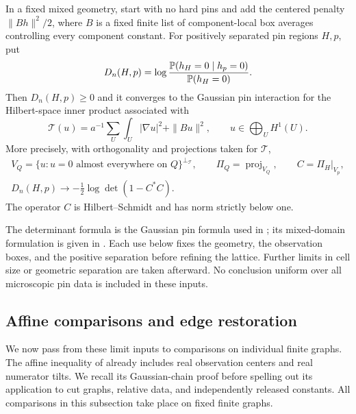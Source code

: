 \begin{theorem}
\label{heights:pin-input}
In a fixed mixed geometry, start with no hard pins and add the centered
penalty \(\|Bh\|^2/2\), where \(B\) is a fixed finite list of
component-local box averages controlling every component constant.
For positively separated pin regions \(H,p\), put
\[
 D_n(H,p)=
 \log\frac{\mathbb P(h_H=0\mid h_p=0)}{\mathbb P(h_H=0)}.
\]
Then \(D_n(H,p)\ge0\) and it converges to the Gaussian pin interaction
for the Hilbert-space inner product associated with
\[
         \mathcal T(u)=a^{-1}\sum_U\int_U|\nabla u|^2+\|Bu\|^2,
         \qquad u\in\bigoplus_U H^1(U).
\]
More precisely, with orthogonality and projections taken for
\(\mathcal T\),
\begin{equation}
 \begin{gathered}
 V_Q=\{u:u=0\text{ almost everywhere on }Q\}^{\perp_{\mathcal T}},
 \qquad \Pi_Q=\operatorname{proj}_{V_Q},\qquad
 C=\Pi_H|_{V_p},\\
             D_n(H,p)\longrightarrow
                  -\frac12\log\det(1-C^*C).
 \end{gathered}
 \tag{1}\label{eq:source-1}
\end{equation}
The operator \(C\) is Hilbert--Schmidt and has norm strictly below one.
\end{theorem}

The determinant formula is the Gaussian pin formula used in
\cite[Theorem~3.2]{C}; its mixed-domain formulation is given in
\cite[Proposition~3.14]{B}. Each use below fixes the geometry, the
observation boxes, and the positive separation before refining the
lattice. Further limits in cell size or geometric separation are
taken afterward. No conclusion uniform over all microscopic pin data
is included in these inputs.

\subsection{Affine comparisons and edge restoration}

We now pass from these limit inputs to comparisons on individual finite
graphs. The affine inequality of \cite[Lemma~2.2]{C} already includes
real observation centers and real numerator tilts. We recall its
Gaussian-chain proof before spelling out its application to cut graphs,
relative data, and independently released constants. All comparisons
in this subsection take place on fixed finite graphs.


